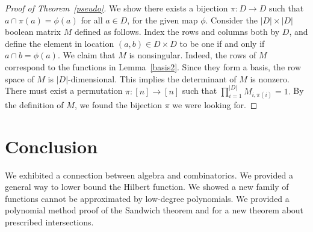 \documentclass[11pt]{article}
\theoremstyle{definition}
\newcommand{\1}{\mathbf{1}}
\begin{document}
\begin{proof}[Proof of Theorem~\ref{pseudo}] We show there exists a bijection $\pi : D\to D$  such that $a \cap \pi(a) = \phi(a)$ for all $a\in D$, for the given map $\phi$.   Consider the $|D| \times |D|$ boolean matrix $M$ defined as follows.   Index the rows and columns both by $D$, and define the element in location $(a,b) \in D \times D$ to be one if and only if $a \cap b = \phi(a)$.  We claim that $M$ is nonsingular.  Indeed, the rows of $M$ correspond to the functions in Lemma~\ref{basis2}.  Since they form a basis,  the row space of $M$ is $|D|$-dimensional.  This implies the determinant of $M$ is nonzero.  There must exist a permutation  $\pi: [n] \to [n]$ such that $\prod_{i = 1}^{|D|} M_{i,\pi(i)} = 1.$   By the definition of $M$, we found the  bijection $\pi$ we were looking for.  
\end{proof}

\section{Conclusion}
We exhibited a connection between algebra and combinatorics.  We provided a general way to lower bound the Hilbert function.  We showed a new family of functions cannot be approximated by low-degree polynomials.  We provided a polynomial method proof of the Sandwich theorem and for a new theorem about prescribed intersections.   %
\end{document}

